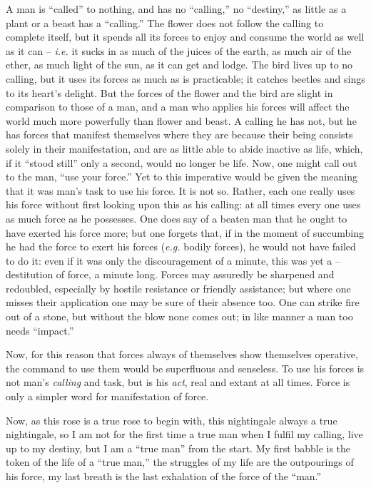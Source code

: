 \documentclass[12pt,a4paper]{book}
\begin{document}
A man is ``called'' to nothing, and has no ``calling,'' no ``destiny,'' 
as little as a plant or a beast has a ``calling.'' The flower does not 
follow the calling to complete itself, but it spends all its forces to enjoy 
and consume the world as well as it can -- \textit{i.e.} it sucks in as much 
of the juices of the earth, as much air of the ether, as much light of the 
sun, as it can get and lodge. The bird lives up to no calling, but it uses its 
forces as much as is practicable; it catches beetles and sings to its heart's 
delight. But the forces of the flower and the bird are slight in comparison to 
those of a man, and a man who applies his forces will affect the world much 
more powerfully than flower and beast. A calling he has not, but he has forces 
that manifest themselves where they are because their being consists solely in 
their manifestation, and are as little able to abide inactive as life, which, 
if it ``stood still'' only a second, would no longer be life. Now, one might 
call out to the man, ``use your force.'' Yet to this imperative would be 
given the meaning that it was man's task to use his force. It is not so. 
Rather, each one really uses his force without first looking upon this as his 
calling: at all times every one uses as much force as he possesses. One does 
say of a beaten man that he ought to have exerted his force more; but one 
forgets that, if in the moment of succumbing he had the force to exert his 
forces (\textit{e.g.} bodily forces), he would not have failed to do it: even 
if it was only the discouragement of a minute, this was yet a --destitution of 
force, a minute long. Forces may assuredly be sharpened and redoubled, 
especially by hostile resistance or friendly assistance; but where one misses 
their application one may be sure of their absence too. One can strike fire 
out of a stone, but without the blow none comes out; in like manner a man too 
needs ``impact.''

Now, for this reason that forces always of themselves show themselves 
operative, the command to use them would be superfluous and senseless. To use 
his forces is not man's \textit{calling} and task, but is his \textit{act}, 
real and extant at all times. Force is only a simpler word for manifestation 
of force.

Now, as this rose is a true rose to begin with, this nightingale always a true 
nightingale, so I am not for the first time a true man when I fulfil my 
calling, live up to my destiny, but I am a ``true man'' from the start. My 
first babble is the token of the life of a ``true man,'' the struggles of my 
life are the outpourings of his force, my last breath is the last exhalation 
of the force of the ``man.''
\end{document}
